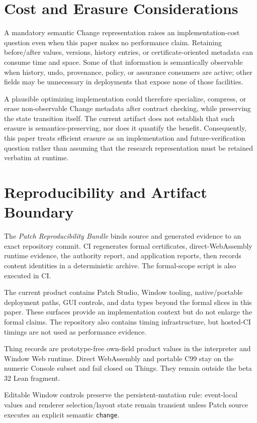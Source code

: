 \documentclass[10pt]{article}
\theoremstyle{plain}
\theoremstyle{remark}
\begin{document}
\section{Cost and Erasure Considerations}
A mandatory semantic Change representation raises an implementation-cost question even when this paper makes no performance claim. Retaining before/after values, versions, history entries, or certificate-oriented metadata can consume time and space. Some of that information is semantically observable when history, undo, provenance, policy, or assurance consumers are active; other fields may be unnecessary in deployments that expose none of those facilities.

A plausible optimizing implementation could therefore specialize, compress, or erase non-observable Change metadata after contract checking, while preserving the state transition itself. The current artifact does not establish that such erasure is semantics-preserving, nor does it quantify the benefit. Consequently, this paper treats efficient erasure as an implementation and future-verification question rather than assuming that the research representation must be retained verbatim at runtime.

\section{Reproducibility and Artifact Boundary}
The \emph{Patch Reproducibility Bundle} binds source and generated evidence to an exact repository commit. CI regenerates formal certificates, direct-WebAssembly runtime evidence, the authority report, and application reports, then records content identities in a deterministic archive. The formal-scope script is also executed in CI.

The current product contains Patch Studio, Window tooling, native/portable deployment paths, GUI controls, and data types beyond the formal slices in this paper. These surfaces provide an implementation context but do not enlarge the formal claims. The repository also contains timing infrastructure, but hosted-CI timings are not used as performance evidence.

Thing records are prototype-free own-field product values in the interpreter and Window Web runtime. Direct WebAssembly and portable C99 stay on the numeric Console subset and fail closed on Things. They remain outside the beta 32 Lean fragment.

Editable Window controls preserve the persistent-mutation rule: event-local values and renderer selection/layout state remain transient unless Patch source executes an explicit semantic \texttt{change}.
\end{document}
